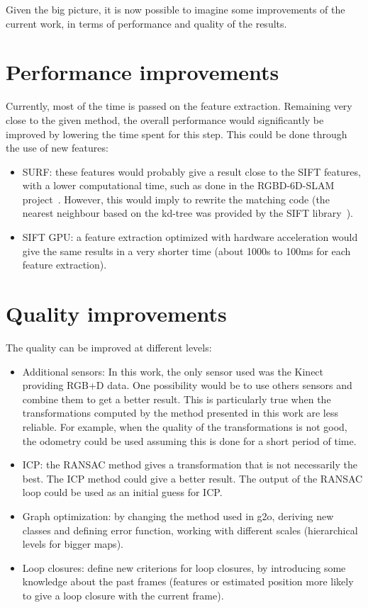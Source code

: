 Given the big picture, it is now possible to imagine some improvements of the current work, in terms of performance and quality of the results.

\section{Performance improvements}

Currently, most of the time is passed on the feature extraction. Remaining very close to the given method, the overall performance would significantly be improved by lowering the time spent for this step. This could be done through the use of new features:
\begin{itemize}
\item SURF: these features would probably give a result close to the SIFT features, with a lower computational time, such as done in the RGBD-6D-SLAM project~\cite{engelhard11euron-workshop}. However, this would imply to rewrite the matching code (the nearest neighbour based on the kd-tree was provided by the SIFT library~\cite{hess_sift}).
\item SIFT GPU: a feature extraction optimized with hardware acceleration would give the same results in a very shorter time (about 1000s to 100ms for each feature extraction).
\end{itemize}

\section{Quality improvements}

The quality can be improved at different levels:
\begin{itemize}
\item Additional sensors: In this work, the only sensor used was the Kinect providing RGB+D data. One possibility would be to use others sensors and combine them to get a better result. This is particularly true when the transformations computed by the method presented in this work are less reliable. For example, when the quality of the transformations is not good, the odometry could be used assuming this is done for a short period of time.
\item ICP: the RANSAC method gives a transformation that is not necessarily the best. The ICP method could give a better result. The output of the RANSAC loop could be used as an initial guess for ICP.
\item Graph optimization: by changing the method used in g2o, deriving new classes and defining error function, working with different scales (hierarchical levels for bigger maps).
\item Loop closures: define new criterions for loop closures, by introducing some knowledge about the past frames (features or estimated position more likely to give a loop closure with the current frame).
\end{itemize}

